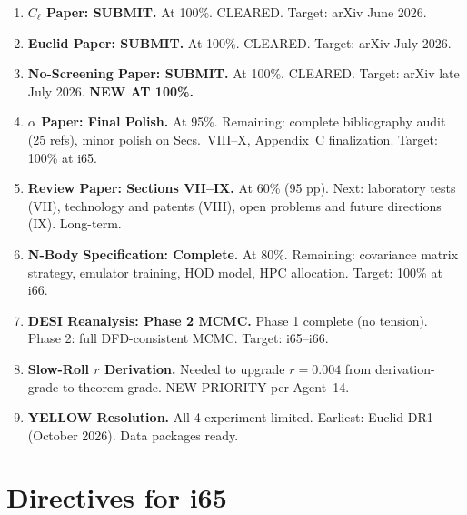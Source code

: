 \documentclass[11pt,a4paper]{article}
\begin{document}
\begin{enumerate}[label=\textbf{P\arabic*.}]
\item \textbf{$C_\ell$ Paper: SUBMIT.} At 100\%. CLEARED. Target: arXiv June 2026.

\item \textbf{Euclid Paper: SUBMIT.} At 100\%. CLEARED. Target: arXiv July 2026.

\item \textbf{No-Screening Paper: SUBMIT.} At 100\%. CLEARED. Target: arXiv late July 2026. \textbf{NEW AT 100\%.}

\item \textbf{$\alpha$ Paper: Final Polish.} At 95\%. Remaining: complete bibliography audit (25 refs), minor polish on Secs.\ VIII--X, Appendix~C finalization. Target: 100\% at i65.

\item \textbf{Review Paper: Sections VII--IX.} At 60\% (95 pp). Next: laboratory tests (VII), technology and patents (VIII), open problems and future directions (IX). Long-term.

\item \textbf{N-Body Specification: Complete.} At 80\%. Remaining: covariance matrix strategy, emulator training, HOD model, HPC allocation. Target: 100\% at i66.

\item \textbf{DESI Reanalysis: Phase 2 MCMC.} Phase 1 complete (no tension). Phase 2: full DFD-consistent MCMC. Target: i65--i66.

\item \textbf{Slow-Roll $r$ Derivation.} Needed to upgrade $r = 0.004$ from derivation-grade to theorem-grade. NEW PRIORITY per Agent~14.

\item \textbf{YELLOW Resolution.} All 4 experiment-limited. Earliest: Euclid DR1 (October 2026). Data packages ready.
\end{enumerate}


\section{Directives for i65}
\label{sec:directives}
\end{document}
